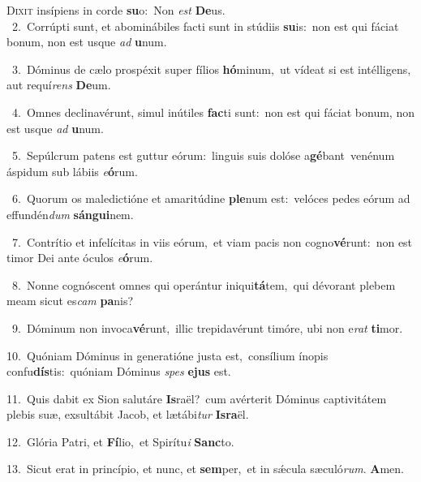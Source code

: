 \lettrine{\initial\textcolor{\initialcolor}{D}}{ixit} insípiens in corde \textbf{su}\-o:~\star Non \textit{est} \textbf{De}\-us.\\
{\numbfont\textcolor{\numbcolor}{~2.}}~Corrúpti sunt, et abominábiles facti sunt in stúdiis \textbf{su}\-is:~\star non est qui fáciat bonum, non est usque \textit{ad} \textbf{u}\-num.\par
{\numbfont\textcolor{\numbcolor}{~3.}}~Dóminus de cælo prospéxit super fílios \textbf{hó}\-minum,~\star ut vídeat si est intélligens, aut requí\textit{rens} \textbf{De}\-um.\par
{\numbfont\textcolor{\numbcolor}{~4.}}~Omnes declinavérunt, simul inútiles \textbf{fac}\-ti sunt:~\star non est qui fáciat bonum, non est usque \textit{ad} \textbf{u}\-num.\par
{\numbfont\textcolor{\numbcolor}{~5.}}~Sepúlcrum patens est guttur eórum:~\dagger linguis suis dolóse a\-\textbf{gé}\-bant~\star venénum áspidum sub lábiis \textit{e}\-\textbf{ó}rum.\par
{\numbfont\textcolor{\numbcolor}{~6.}}~Quorum os maledictióne et amaritúdine \textbf{ple}\-num est:~\star velóces pedes eórum ad effundén\textit{dum} \textbf{sán}\-\textbf{gui}nem.\par
{\numbfont\textcolor{\numbcolor}{~7.}}~Contrítio et infelícitas in viis eórum,~\dagger et viam pacis non cogno\-\textbf{vé}\-runt:~\star non est timor Dei ante óculos \textit{e}\-\textbf{ó}rum.\par
{\numbfont\textcolor{\numbcolor}{~8.}}~Nonne cognóscent omnes qui operántur iniqui\-\textbf{tá}\-tem,~\star qui dévorant plebem meam sicut es\textit{cam} \textbf{pa}\-nis?\par
{\numbfont\textcolor{\numbcolor}{~9.}}~Dóminum non invoca\-\textbf{vé}\-runt,~\star illic trepidavérunt timóre, ubi non e\textit{rat} \textbf{ti}\-mor.\par
{\numbfont\textcolor{\numbcolor}{10.}}~Quóniam Dóminus in generatióne justa est,~\dagger consílium ínopis confu\-\textbf{dís}\-tis:~\star quóniam Dóminus \textit{spes} \textbf{e}\-\textbf{jus} est.\par
{\numbfont\textcolor{\numbcolor}{11.}}~Quis dabit ex Sion salutáre \textbf{Is}\-raël?~\star cum avérterit Dóminus captivitátem plebis suæ, exsultábit Jacob, et lætábi\textit{tur} \textbf{Is}\-\textbf{ra}ël.\par
{\numbfont\textcolor{\numbcolor}{12.}}~Glória Patri, et \textbf{Fí}\-lio,~\star et Spirítu\textit{i} \textbf{Sanc}\-to.\par
{\numbfont\textcolor{\numbcolor}{13.}}~Sicut erat in princípio, et nunc, et \textbf{sem}\-per,~\star et in sǽcula sæculó\-\textit{rum}\-. \textbf{A}\-men.\par
